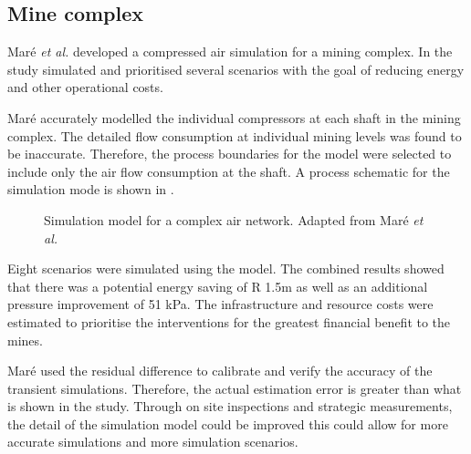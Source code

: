 \subsection{Mine complex}
Maré \textit{et al.} \cite{Mare2017Evaluating} developed a compressed air simulation for a mining complex. In the study \cite{Mare2017Evaluating} simulated and prioritised several scenarios with the goal of reducing energy and other operational costs. 
\par
 Maré accurately modelled the individual compressors at each shaft in the mining complex. The detailed flow consumption at individual mining levels was found to be inaccurate. Therefore, the process boundaries for the model were selected to include only the air flow consumption at the shaft. A process schematic for the simulation mode is shown in .
 
 \begin{figure}[!htbp]
 	\centering
 	\caption[Simulation model for a complex air network]{Simulation model for a complex air network. Adapted from Maré \textit{et al.} \cite{Mare2017Evaluating}}
 	\label{fig:Mare model}
 \end{figure}
\par 
 Eight scenarios were simulated using the model. The combined results showed that there was a potential energy saving of R 1.5m as well as an additional pressure improvement of 51 kPa. The infrastructure and resource costs were estimated to prioritise the interventions for the greatest financial benefit to the mines.	
\par
	Maré used the residual difference to calibrate and verify the accuracy of the transient simulations. Therefore, the actual estimation error is greater than what is shown in the study. Through on site inspections and strategic measurements, the detail of the simulation model could be improved this could allow for more accurate simulations and more simulation scenarios.
